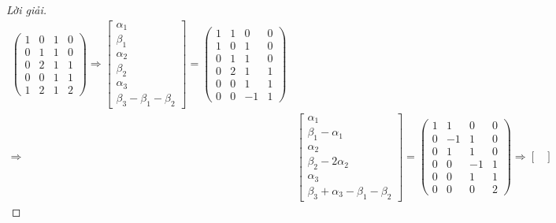 \documentclass[class=linearalgebra,crop=false]{standalone}
\begin{document}
\begin{proof}[Lời giải]
\begin{align*}
\begin{pmatrix}
            1 & 0 & 1 & 0 \\
            0 & 1 & 1 & 0 \\
            0 & 2 & 1 & 1 \\
            0 & 0 & 1 & 1 \\
            1 & 2 & 1 & 2
        \end{pmatrix}
        \Longrightarrow
        \begin{bmatrix}
            \alpha_{1} \\
            \beta_{1}  \\
            \alpha_{2} \\
            \beta_{2}  \\
            \alpha_{3} \\
            \beta_{3} - \beta_{1} - \beta_{2}
        \end{bmatrix}=
        \begin{pmatrix}
            1 & 1 & 0  & 0 \\
            1 & 0 & 1  & 0 \\
            0 & 1 & 1  & 0 \\
            0 & 2 & 1  & 1 \\
            0 & 0 & 1  & 1 \\
            0 & 0 & -1 & 1
        \end{pmatrix}                   \\
        \Longrightarrow &
        \begin{bmatrix}
            \alpha_{1}              \\
            \beta_{1} - \alpha_{1}  \\
            \alpha_{2}              \\
            \beta_{2} - 2\alpha_{2} \\
            \alpha_{3}              \\
            \beta_{3} + \alpha_{3} - \beta_{1} - \beta_{2}
        \end{bmatrix}=
        \begin{pmatrix}
            1 & 1  & 0  & 0 \\
            0 & -1 & 1  & 0 \\
            0 & 1  & 1  & 0 \\
            0 & 0  & -1 & 1 \\
            0 & 0  & 1  & 1 \\
            0 & 0  & 0  & 2
        \end{pmatrix}
        \Longrightarrow
        \begin{bmatrix}

\end{bmatrix}
\end{align*}
\end{proof}
\end{document}
